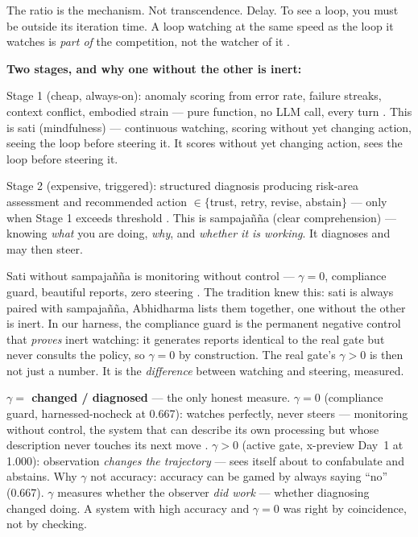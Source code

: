 \documentclass[11pt]{article}
\begin{document}
The ratio is the mechanism. Not transcendence. Delay. To see a loop, you must be outside its iteration time. A loop watching at the same speed as the loop it watches is \emph{part of} the competition, not the watcher of it \citep{baars1997}.

\textbf{Two stages, and why one without the other is inert:}

Stage 1 (cheap, always-on): anomaly scoring from error rate, failure streaks, context conflict, embodied strain --- pure function, no LLM call, every turn \citep{macar2026}. This is sati (mindfulness) --- continuous watching, scoring without yet changing action, seeing the loop before steering it. It scores without yet changing action, sees the loop before steering it.

Stage 2 (expensive, triggered): structured diagnosis producing risk-area assessment and recommended action $\in\{$trust, retry, revise, abstain$\}$ --- only when Stage 1 exceeds threshold \citep{cao2026}. This is sampaja\~n\~na (clear comprehension) --- knowing \emph{what} you are doing, \emph{why}, and \emph{whether it is working}. It diagnoses and may then steer.

Sati without sampaja\~n\~na is monitoring without control --- $\gamma=0$, compliance guard, beautiful reports, zero steering \citep{macar2026}. The tradition knew this: sati is always paired with sampaja\~n\~na, Abhidharma lists them together, one without the other is inert. In our harness, the compliance guard is the permanent negative control that \emph{proves} inert watching: it generates reports identical to the real gate but never consults the policy, so $\gamma=0$ by construction. The real gate's $\gamma>0$ is then not just a number. It is the \emph{difference} between watching and steering, measured.

\textbf{$\gamma = $ changed / diagnosed} --- the only honest measure. $\gamma=0$ (compliance guard, harnessed-nocheck at 0.667): watches perfectly, never steers --- monitoring without control, the system that can describe its own processing but whose description never touches its next move \citep{lindsey2025,macar2026}. $\gamma>0$ (active gate, x-preview Day~1 at 1.000): observation \emph{changes the trajectory} --- sees itself about to confabulate and abstains. Why $\gamma$ not accuracy: accuracy can be gamed by always saying ``no'' (0.667). $\gamma$ measures whether the observer \emph{did work} --- whether diagnosing changed doing. A system with high accuracy and $\gamma=0$ was right by coincidence, not by checking.
\end{document}
